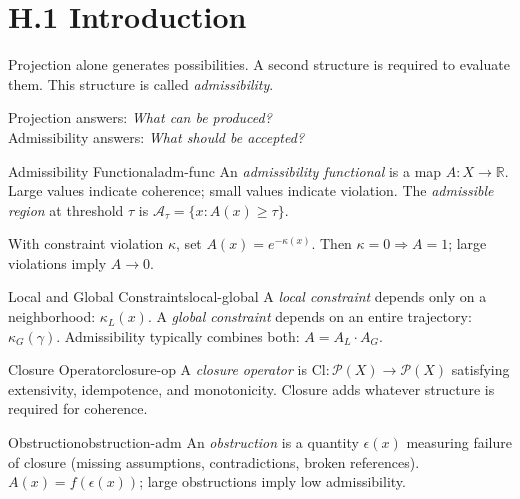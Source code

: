 
\section*{H.1 Introduction}

Projection alone generates possibilities. A second structure is required
to evaluate them. This structure is called \emph{admissibility}.

\begin{tcolorbox}[enhanced, colback=RSVPdeep, colframe=RSVPdeep,
  coltext=white, arc=6pt, boxrule=0pt, left=6mm, right=6mm, top=5mm, bottom=5mm]
  Projection answers: \emph{What can be produced?}\\
  Admissibility answers: \emph{What should be accepted?}
\end{tcolorbox}

\begin{definition}{Admissibility Functional}{adm-func}
  An \emph{admissibility functional} is a map $A : X \to \mathbb{R}$.
  Large values indicate coherence; small values indicate violation.
  The \emph{admissible region} at threshold $\tau$ is
  $\mathcal{A}_\tau = \{x : A(x) \geq \tau\}$.
\end{definition}

\begin{example}
  With constraint violation $\kappa$, set $A(x) = e^{-\kappa(x)}$.
  Then $\kappa = 0 \Rightarrow A = 1$; large violations imply $A \to 0$.
\end{example}

\begin{definition}{Local and Global Constraints}{local-global}
  A \emph{local constraint} depends only on a neighborhood: $\kappa_L(x)$.
  A \emph{global constraint} depends on an entire trajectory: $\kappa_G(\gamma)$.
  Admissibility typically combines both: $A = A_L \cdot A_G$.
\end{definition}

\begin{definition}{Closure Operator}{closure-op}
  A \emph{closure operator} is $\mathrm{Cl} : \mathcal{P}(X) \to \mathcal{P}(X)$
  satisfying extensivity, idempotence, and monotonicity.
  Closure adds whatever structure is required for coherence.
\end{definition}

\begin{definition}{Obstruction}{obstruction-adm}
  An \emph{obstruction} is a quantity $\epsilon(x)$ measuring failure of
  closure (missing assumptions, contradictions, broken references).
  $A(x) = f(\epsilon(x))$; large obstructions imply low admissibility.
\end{definition}

